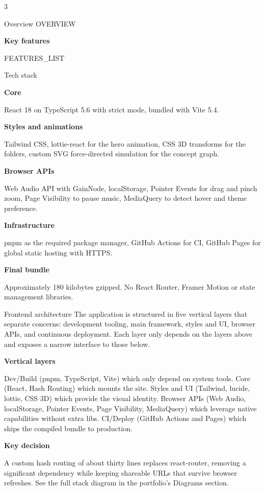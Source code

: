 \documentclass[10pt]{article}
\newcommand{\posterheading}[1]{%
  \vspace{4pt}%
  \par{\color{accentdark}\sffamily\bfseries #1}\par
  \vspace{2pt}%
}
\begin{document}
\setlength{\columnsep}{18pt}
\begin{multicols}{3}


\begin{posterblock}{Overview}
{{OVERVIEW}}

\posterheading{Key features}
{{FEATURES_LIST}}
\end{posterblock}

\begin{posterblock}{Tech stack}
\posterheading{Core}
React 18 on TypeScript 5.6 with strict mode, bundled with Vite 5.4.

\posterheading{Styles and animations}
Tailwind CSS, lottie-react for the hero animation, CSS 3D transforms for the folders, custom SVG force-directed simulation for the concept graph.

\posterheading{Browser APIs}
Web Audio API with GainNode, localStorage, Pointer Events for drag and pinch zoom, Page Visibility to pause music, MediaQuery to detect hover and theme preference.

\posterheading{Infrastructure}
pnpm as the required package manager, GitHub Actions for CI, GitHub Pages for global static hosting with HTTPS.

\posterheading{Final bundle}
Approximately 180 kilobytes gzipped. No React Router, Framer Motion or state management libraries.
\end{posterblock}


\begin{posterblock}{Frontend architecture}
The application is structured in five vertical layers that separate concerns: development tooling, main framework, styles and UI, browser APIs, and continuous deployment. Each layer only depends on the layers above and exposes a narrow interface to those below.

\posterheading{Vertical layers}
Dev/Build (pnpm, TypeScript, Vite) which only depend on system tools. Core (React, Hash Routing) which mounts the site. Styles and UI (Tailwind, lucide, lottie, CSS 3D) which provide the visual identity. Browser APIs (Web Audio, localStorage, Pointer Events, Page Visibility, MediaQuery) which leverage native capabilities without extra libs. CI/Deploy (GitHub Actions and Pages) which ships the compiled bundle to production.

\posterheading{Key decision}
A custom hash routing of about thirty lines replaces react-router, removing a significant dependency while keeping shareable URLs that survive browser refreshes. See the full stack diagram in the portfolio's Diagrams section.
\end{posterblock}


\end{multicols}
\end{document}
